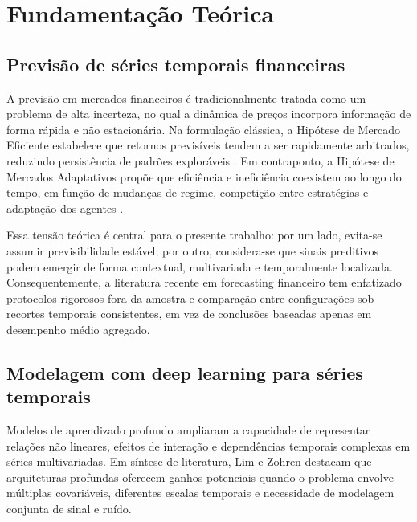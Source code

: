 \chapter{Fundamentação Teórica}


\section{Previsão de séries temporais financeiras}
A previsão em mercados financeiros é tradicionalmente tratada como um problema de alta incerteza, no qual a dinâmica de preços incorpora informação de forma rápida e não estacionária. Na formulação clássica, a Hipótese de Mercado Eficiente estabelece que retornos previsíveis tendem a ser rapidamente arbitrados, reduzindo persistência de padrões exploráveis \cite{FAMA1991}. Em contraponto, a Hipótese de Mercados Adaptativos propõe que eficiência e ineficiência coexistem ao longo do tempo, em função de mudanças de regime, competição entre estratégias e adaptação dos agentes \cite{LO2004}.

Essa tensão teórica é central para o presente trabalho: por um lado, evita-se assumir previsibilidade estável; por outro, considera-se que sinais preditivos podem emergir de forma contextual, multivariada e temporalmente localizada. Consequentemente, a literatura recente em forecasting financeiro tem enfatizado protocolos rigorosos fora da amostra e comparação entre configurações sob recortes temporais consistentes, em vez de conclusões baseadas apenas em desempenho médio agregado.

\section{Modelagem com deep learning para séries temporais}
Modelos de aprendizado profundo ampliaram a capacidade de representar relações não lineares, efeitos de interação e dependências temporais complexas em séries multivariadas. Em síntese de literatura, Lim e Zohren \cite{LIMZOHREN2021} destacam que arquiteturas profundas oferecem ganhos potenciais quando o problema envolve múltiplas covariáveis, diferentes escalas temporais e necessidade de modelagem conjunta de sinal e ruído.


